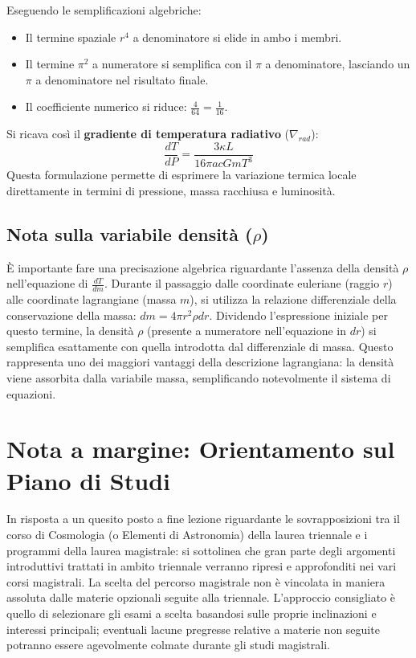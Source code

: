 Eseguendo le semplificazioni algebriche:
\begin{itemize}
\item Il termine spaziale $r^4$ a denominatore si elide in ambo i membri.
\item Il termine $\pi^2$ a numeratore si semplifica con il $\pi$ a denominatore, lasciando un $\pi$ a denominatore nel risultato finale.
\item Il coefficiente numerico si riduce: $\frac{4}{64} = \frac{1}{16}$.
\end{itemize}

Si ricava così il \textbf{gradiente di temperatura radiativo} ($\nabla_{rad}$):
\begin{equation}
\frac{dT}{dP} = \frac{3 \kappa L}{16 \pi a c G m T^3}
\end{equation}
Questa formulazione permette di esprimere la variazione termica locale direttamente in termini di pressione, massa racchiusa e luminosità.

\subsection{Nota sulla variabile densità ($\rho$)}
È importante fare una precisazione algebrica riguardante l'assenza della densità $\rho$ nell'equazione di $\frac{dT}{dm}$. Durante il passaggio dalle coordinate euleriane (raggio $r$) alle coordinate lagrangiane (massa $m$), si utilizza la relazione differenziale della conservazione della massa: $dm = 4\pi r^2 \rho dr$. Dividendo l'espressione iniziale per questo termine, la densità $\rho$ (presente a numeratore nell'equazione in $dr$) si semplifica esattamente con quella introdotta dal differenziale di massa. Questo rappresenta uno dei maggiori vantaggi della descrizione lagrangiana: la densità viene assorbita dalla variabile massa, semplificando notevolmente il sistema di equazioni.

\section*{Nota a margine: Orientamento sul Piano di Studi}
In risposta a un quesito posto a fine lezione riguardante le sovrapposizioni tra il corso di Cosmologia (o Elementi di Astronomia) della laurea triennale e i programmi della laurea magistrale: si sottolinea che gran parte degli argomenti introduttivi trattati in ambito triennale verranno ripresi e approfonditi nei vari corsi magistrali. La scelta del percorso magistrale non è vincolata in maniera assoluta dalle materie opzionali seguite alla triennale. L'approccio consigliato è quello di selezionare gli esami a scelta basandosi sulle proprie inclinazioni e interessi principali; eventuali lacune pregresse relative a materie non seguite potranno essere agevolmente colmate durante gli studi magistrali.